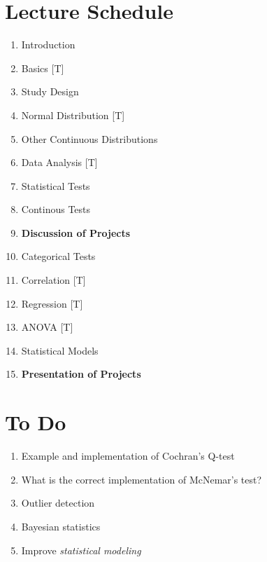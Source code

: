 \clearpage


\clearpage

\section{Lecture Schedule}

\begin{enumerate}
  \item Introduction
  \item Basics [T]
  \item Study Design
  \item Normal Distribution [T]
  \item Other Continuous Distributions
  \item Data Analysis [T]
  \item Statistical Tests
  \item Continous Tests
  \item \textbf{Discussion of Projects}
  \item Categorical Tests
  \item Correlation [T]
  \item Regression [T]
  \item ANOVA [T]
  \item Statistical Models
  \item \textbf{Presentation of Projects}
\end{enumerate}

\section{To Do}

\begin{enumerate}
  \item Example and implementation of Cochran's Q-test
  \item What is the correct implementation of McNemar's test?
  \item Outlier detection
  \item Bayesian statistics
  \item Improve \emph{statistical modeling}
\end{enumerate}

